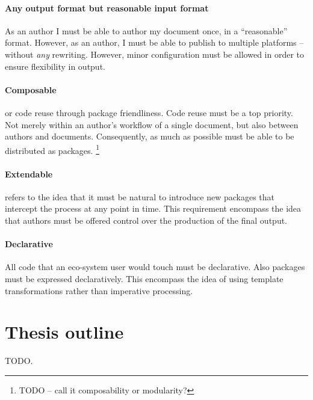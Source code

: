 \documentclass{scrreprt}
\begin{document}
\paragraph{Any output format but reasonable input format}
As an author I must be able to author my document once, in a ``reasonable'' format. However, as an author, I must be able to publish to multiple platforms -- without \emph{any} rewriting. However, minor configuration must be allowed in order to ensure flexibility in output.

\paragraph{Composable} or code reuse through package friendliness. Code reuse must be a top priority. Not merely within an author's workflow of a single document, but also between authors and documents. Consequently, as much as possible must be able to be distributed as packages. \footnote{TODO -- call it composability or modularity?}

\paragraph{Extendable} refers to the idea that it must be natural to introduce new packages that intercept the process at any point in time. This requirement encompass the idea that authors must be offered control over the production of the final output.

\paragraph{Declarative}
All code that an eco-system user would touch must be declarative. Also packages must be expressed declaratively. This encompass the idea of using template transformations rather than imperative processing.




\section{Thesis outline}
TODO.
\end{document}

